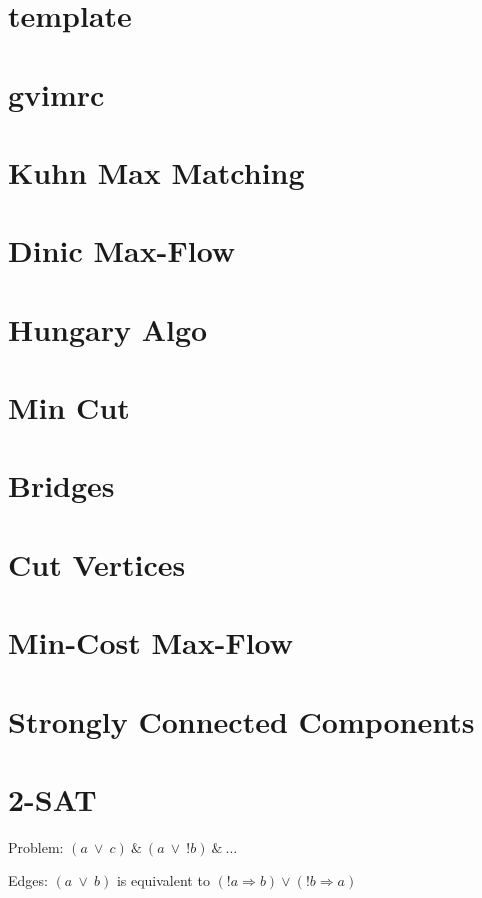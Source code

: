 \documentclass[10pt]{article}
\begin{document}
\section{template}

\section{gvimrc}

\section{Kuhn Max Matching}

\section{Dinic Max-Flow}

\section{Hungary Algo}

\section{Min Cut}

\section{Bridges}

\section{Cut Vertices}

\section{Min-Cost Max-Flow}

\section{Strongly Connected Components}


\section{2-SAT}
Problem: $(a ~ \vee ~ c) ~ \& ~ (a ~ \vee ~ !b) ~\& ~\ldots$

Edges: $(a ~ \vee ~ b)$ is equivalent to $(!a \Rightarrow b) \vee (!b \Rightarrow a)$
\end{document}
